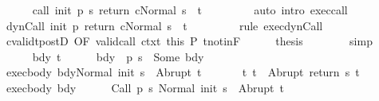 \begin{isabellebody}
\ \ \ \ \isamarkupfalse%
\ {\isachardoublequoteopen}{\isasymGamma}{\isasymturnstile}{\isasymlangle}call\ init\ {\isacharparenleft}p\ s{\isacharparenright}\ return{\isacharprime}\ c{\isacharcomma}Normal\ s{\isasymrangle}\ {\isasymRightarrow}\ t{\isachardoublequoteclose}\ \isanewline
\ \ \ \ \ \ \isamarkupfalse%
\ {\isacharparenleft}auto\ intro{\isacharcolon}\ exec{\isacharunderscore}call{\isacharparenright}\isanewline
\ \ \ \ \isamarkupfalse%
\ {\isachardoublequoteopen}{\isasymGamma}{\isasymturnstile}{\isasymlangle}dynCall\ init\ p\ return{\isacharprime}\ c{\isacharcomma}Normal\ s{\isasymrangle}\ {\isasymRightarrow}\ t{\isachardoublequoteclose}\ \isanewline
\ \ \ \ \ \ \isamarkupfalse%
\ {\isacharparenleft}rule\ exec{\isacharunderscore}dynCall{\isacharparenright}\isanewline
\ \ \ \ \isamarkupfalse%
\ cvalidt{\isacharunderscore}postD\ {\isacharbrackleft}OF\ valid{\isacharunderscore}call\ ctxt\ this{\isacharbrackright}\ P\ t{\isacharunderscore}notin{\isacharunderscore}F\isanewline
\ \ \ \ \isamarkupfalse%
\ {\isacharquery}thesis\isanewline
\ \ \ \ \ \ \isamarkupfalse%
\ simp\isanewline
\ \ \isamarkupfalse%
\isanewline
\ \ \ \ \isamarkupfalse%
\ bdy\ t{\isacharprime}\isanewline
\ \ \ \ \isamarkupfalse%
\ bdy{\isacharcolon}\ {\isachardoublequoteopen}{\isasymGamma}\ {\isacharparenleft}p\ s{\isacharparenright}\ {\isacharequal}\ Some\ bdy{\isachardoublequoteclose}\isanewline
\ \ \ \ \isamarkupfalse%
\ exec{\isacharunderscore}body{\isacharcolon}\ {\isachardoublequoteopen}{\isasymGamma}{\isasymturnstile}{\isasymlangle}bdy{\isacharcomma}Normal\ {\isacharparenleft}init\ s{\isacharparenright}{\isasymrangle}\ {\isasymRightarrow}\ Abrupt\ t{\isacharprime}{\isachardoublequoteclose}\ \isanewline
\ \ \ \ \isamarkupfalse%
\ t{\isacharcolon}\ {\isachardoublequoteopen}t\ {\isacharequal}\ Abrupt\ {\isacharparenleft}return\ s\ t{\isacharprime}{\isacharparenright}{\isachardoublequoteclose}\isanewline
\ \ \ \ \isamarkupfalse%
\ \isamarkupfalse%
\ exec{\isacharunderscore}body\ bdy\isanewline
\ \ \ \ \isamarkupfalse%
\ {\isachardoublequoteopen}{\isasymGamma}{\isasymturnstile}{\isasymlangle}Call\ {\isacharparenleft}p\ s{\isacharparenright}\ {\isacharcomma}Normal\ {\isacharparenleft}init\ s{\isacharparenright}{\isasymrangle}\ {\isasymRightarrow}\ Abrupt\ t{\isacharprime}{\isachardoublequoteclose}\isanewline
\ \ \ \ \ \ \isamarkupfalse%

\end{isabellebody}
